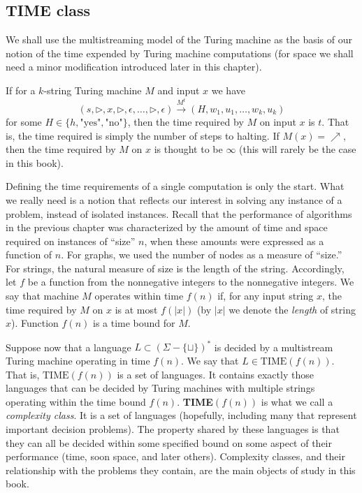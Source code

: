 \documentclass[12pt]{article}
\begin{document}
\subsection{TIME class}
\begin{defbox}
  We shall use the multistreaming model of the Turing machine as the basis of our notion of the time expended by Turing machine computations (for space we shall need a minor modification introduced later in this chapter).

  If for a $k$-string Turing machine $M$ and input $x$ we have 
  \[
  (s, \triangleright, x, \triangleright, \epsilon, \ldots, \triangleright, \epsilon) \xrightarrow{M^t} (H, w_1, u_1, \ldots, w_k, u_k)
  \]
  for some $H \in \{h, \text{"yes"}, \text{"no"}\}$, then the time required by $M$ on input $x$ is $t$. That is, the time required is simply the number of steps to halting. If $M(x) = \nearrow$, then the time required by $M$ on $x$ is thought to be $\infty$ (this will rarely be the case in this book).
  
  Defining the time requirements of a single computation is only the start. What we really need is a notion that reflects our interest in solving any instance of a problem, instead of isolated instances. Recall that the performance of algorithms in the previous chapter was characterized by the amount of time and space required on instances of ``size'' $n$, when these amounts were expressed as a function of $n$. For graphs, we used the number of nodes as a measure of ``size.'' For strings, the natural measure of size is the length of the string. Accordingly, let $f$ be a function from the nonnegative integers to the nonnegative integers. We say that machine $M$ operates within time $f(n)$ if, for any input string $x$, the time required by $M$ on $x$ is at most $f(|x|)$ (by $|x|$ we denote the \textit{length} of string $x$). Function $f(n)$ is a time bound for $M$.
  
  Suppose now that a language $L \subset (\Sigma - \{\sqcup\})^*$ is decided by a multistream Turing machine operating in time $f(n)$. We say that $L \in \text{TIME}(f(n))$. That is, $\text{TIME}(f(n))$ is a set of languages. It contains exactly those languages that can be decided by Turing machines with multiple strings operating within the time bound $f(n)$.
  \textbf{TIME}$(f(n))$ is what we call a \textit{complexity class}. It is a set of languages (hopefully, including many that represent important decision problems). The property shared by these languages is that they can all be decided within some specified bound on some aspect of their performance (time, soon space, and later others). Complexity classes, and their relationship with the problems they contain, are the main objects of study in this book.
\end{defbox}
\end{document}

